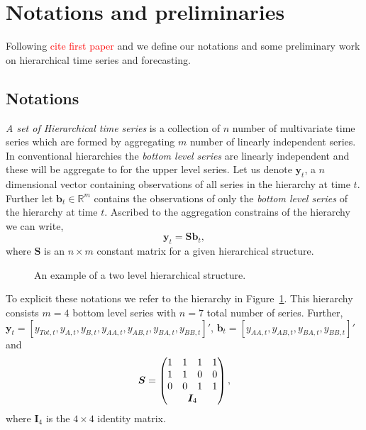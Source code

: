 \documentclass[12pt]{article}
\theoremstyle{definition}
\begin{document}
\section{Notations and preliminaries}\label{sec:Notat&Prelim}

Following \textcolor{red}{cite first paper} and \cite{WicEtAl2019} we define our notations and some preliminary work on hierarchical time series and forecasting. 

\subsection{Notations}\label{sec:notation}

\emph{A set of Hierarchical time series} is a collection of $n$ number of multivariate time series which are formed by aggregating $m$ number of linearly independent series. In conventional hierarchies the \emph{bottom level series} are linearly independent and these will be aggregate to for the upper level series. Let us denote $\bm{y}_t$, a $n$ dimensional vector containing observations of all series in the hierarchy at time $t$. Further let $\bm{b}_t \in \mathbb{R}^m$ contains the observations of only the \emph{bottom level series} of the hierarchy at time $t$. Ascribed to the aggregation constrains of the hierarchy we can write, 
\begin{equation}\label{eq:coheObservations}
\bm{y}_t = \bm{Sb}_t,
\end{equation}
where $\bm{S}$ is an $n \times m$ constant matrix for a given hierarchical structure. 

\begin{figure}[H]
	\begin{center}
		 
		 
		 
		\qobitree
	\end{center}
	\caption{An example of a two level hierarchical structure.}\label{fig:twoL-hier}
\end{figure}

To explicit these notations we refer to the hierarchy in Figure~\ref{fig:twoL-hier}. This hierarchy consists $m=4$ bottom level series with $n=7$ total number of series. Further, $\bm{y}_t = [y_{Tot,t},y_{A,t}, y_{B,t},y_{AA,t}, y_{AB,t}, y_{BA,t}, y_{BB,t}]'$, $\bm{b}_t = [y_{AA,t}, y_{AB,t}, y_{BA,t}, y_{BB,t}]'$ and
\[
\bm{S} = \begin{pmatrix}
1 & 1 & 1 & 1  \\
1 & 1 & 0 & 0 \\
0 & 0 & 1 & 1 \\
& \multicolumn{2}{c}{\bm{I}_4} &
\end{pmatrix},
\]
where $\bm{I}_4$ is the $4\times 4$ identity matrix.
\end{document}
